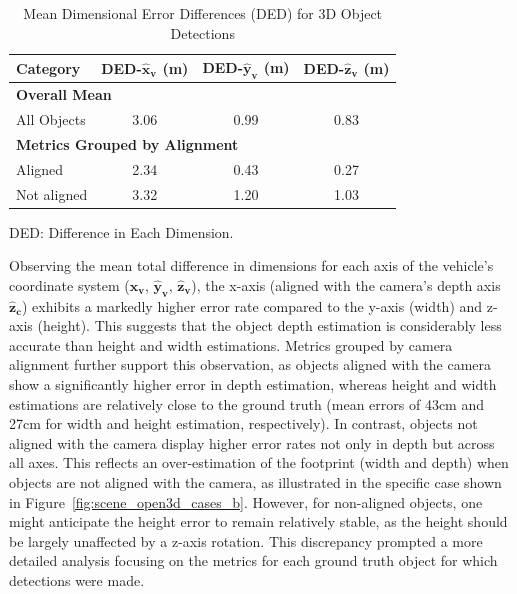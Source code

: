 \begin{table}[h!]
    \centering
    \begin{tabular}{|l|c|c|c|}
        \hline
        \textbf{Category} & \textbf{DED-}$\mathbf{\hat{x}_v}$ (m) & \textbf{DED-}$\mathbf{\hat{y}_v}$ (m) & \textbf{DED-}$\mathbf{\hat{z}_v}$ (m) \\
        \hline
        
        \multicolumn{4}{|l|}{\textbf{Overall Mean}} \\
        \hline
        All Objects & 3.06 & 0.99 & 0.83 \\
        \hline

        \multicolumn{4}{|l|}{\textbf{Metrics Grouped by Alignment}} \\
        \hline
        Aligned & 2.34 & 0.43 & 0.27 \\
        Not aligned & 3.32 & 1.20 & 1.03 \\
        \hline
    \end{tabular}
    \begin{tablenotes}
        \item[] DED: Difference in Each Dimension.
    \end{tablenotes}
    \caption{Mean Dimensional Error Differences (DED) for 3D Object Detections}
    \label{tab:combined_ded_metrics}
\end{table}

Observing the mean total difference in dimensions for each axis of the vehicle's coordinate system ($\mathbf{\hat{x}_v}$, $\mathbf{\hat{y}_v}$, $\mathbf{\hat{z}_v}$), the x-axis (aligned with the camera's depth axis $\mathbf{\hat{z}_c}$) exhibits a markedly higher error rate compared to the y-axis (width) and z-axis (height). This suggests that the object depth estimation is considerably less accurate than height and width estimations. Metrics grouped by camera alignment further support this observation, as objects aligned with the camera show a significantly higher error in depth estimation, whereas height and width estimations are relatively close to the ground truth (mean errors of 43cm and 27cm for width and height estimation, respectively). In contrast, objects not aligned with the camera display higher error rates not only in depth but across all axes. This reflects an over-estimation of the footprint (width and depth) when objects are not aligned with the camera, as illustrated in the specific case shown in Figure~\ref{fig:scene_open3d_cases_b}.
However, for non-aligned objects, one might anticipate the height error to remain relatively stable, as the height should be largely unaffected by a z-axis rotation. This discrepancy prompted a more detailed analysis focusing on the metrics for each ground truth object for which detections were made.

